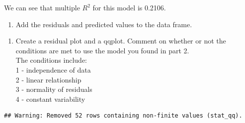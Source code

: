 \documentclass[]{article}
\newenvironment{Shaded}{\begin{snugshade}}{\end{snugshade}}
\newcommand{\DataTypeTok}[1]{\textcolor[rgb]{0.13,0.29,0.53}{#1}}
\newcommand{\KeywordTok}[1]{\textcolor[rgb]{0.13,0.29,0.53}{\textbf{#1}}}
\newcommand{\NormalTok}[1]{#1}
\newcommand{\OperatorTok}[1]{\textcolor[rgb]{0.81,0.36,0.00}{\textbf{#1}}}
\newcommand{\StringTok}[1]{\textcolor[rgb]{0.31,0.60,0.02}{#1}}
\providecommand{\tightlist}{%
  \setlength{\itemsep}{0pt}\setlength{\parskip}{0pt}}
\begin{document}
We can see that multiple \(R^2\) for this model is 0.2106.

\newpage

\begin{enumerate}
\def\labelenumi{\arabic{enumi}.}
\setcounter{enumi}{5}
\tightlist
\item
  Add the residuals and predicted values to the data frame.
\end{enumerate}

\begin{Shaded}
\end{Shaded}

\begin{enumerate}
\def\labelenumi{\arabic{enumi}.}
\setcounter{enumi}{6}
\tightlist
\item
  Create a residual plot and a qqplot. Comment on whether or not the
  conditions are met to use the model you found in part 2.\\
  The conditions include:\\
  1 - independence of data\\
  2 - linear relationship\\
  3 - normality of residuals\\
  4 - constant variability
\end{enumerate}

\begin{Shaded}
\end{Shaded}

\begin{verbatim}
## Warning: Removed 52 rows containing non-finite values (stat_qq).
\end{verbatim}
\end{document}

